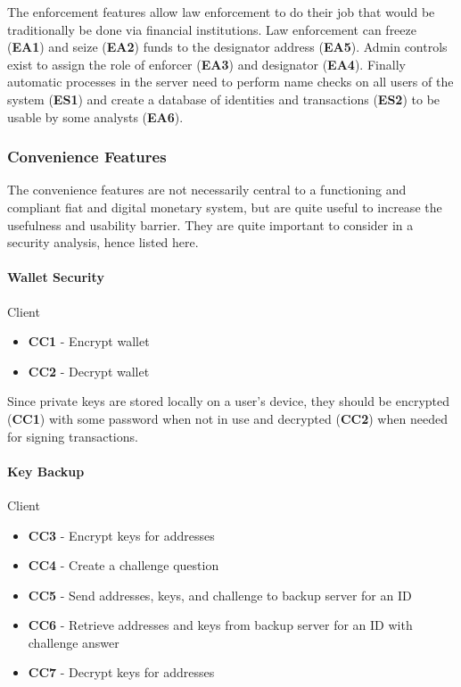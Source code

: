 \documentclass[a4paper,12pt]{article} %
\begin{document}
{{The enforcement features allow law enforcement to do their job that would be traditionally be done via financial institutions. Law enforcement can freeze (\textbf{EA1}) and seize (\textbf{EA2}) funds to the designator address (\textbf{EA5}). Admin controls exist to assign the role of enforcer (\textbf{EA3}) and designator (\textbf{EA4}). Finally automatic processes in the server need to perform name checks on all users of the system (\textbf{ES1}) and create a database of identities and transactions (\textbf{ES2}) to be usable by some analysts (\textbf{EA6}).

\subsubsection{Convenience Features} \label{sssec:3.3:backup}

The convenience features are not necessarily central to a functioning and compliant fiat and digital monetary system, but are quite useful to increase the usefulness and usability barrier. They are quite important to consider in a security analysis, hence listed here.

\paragraph{Wallet Security}
Client
\begin{itemize}
	\item \textbf{CC1} - Encrypt wallet
	\item \textbf{CC2} - Decrypt wallet
\end{itemize}

Since private keys are stored locally on a user's device, they should be encrypted (\textbf{CC1}) with some password when not in use and decrypted (\textbf{CC2}) when needed for signing transactions.

\paragraph{Key Backup}

Client
\begin{itemize}
	\item \textbf{CC3} - Encrypt keys for addresses
	\item \textbf{CC4} - Create a challenge question
	\item \textbf{CC5} - Send addresses, keys, and challenge to backup server for an ID
	\item \textbf{CC6} - Retrieve addresses and keys from backup server for an ID with challenge answer
	\item \textbf{CC7} - Decrypt keys for addresses
\end{itemize}

}}
\end{document}
